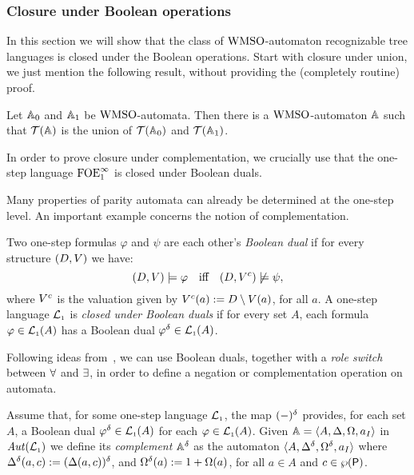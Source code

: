 
\subsubsection{Closure under Boolean operations}

In this section we will show that the class of $\mathrm{WMSO}$-automaton recognizable
tree languages is closed under the Boolean operations.
%
Start with closure under union, we just mention the following result, without
providing the (completely routine) proof.

\begin{theorem}
\label{t:cl-dis}
Let $\mathbb{A}_{0}$ and $\mathbb{A}_{1}$ be $\mathrm{WMSO}$-automata. 
Then there is a $\mathrm{WMSO}$-automaton $\mathbb{A}$ such that $\mathcal{T}(\mathbb{A})$ is the 
union of $\mathcal{T}(\mathbb{A}_{0})$ and $\mathcal{T}(\mathbb{A}_{1})$.
\end{theorem}

In order to prove closure under complementation, we crucially use that the 
one-step language $\mathrm{FOE}^{\infty}_1$ is closed under Boolean duals.

Many properties of parity automata can already be determined at the one-step level.
An important example concerns the notion of complementation.


\begin{definition}
\label{d:bdual1}
Two one-step formulas $\varphi$ and $\psi$ are each other's \emph{Boolean dual}
if for every structure $(D,V)$ we have:
\[
(D,\val) \models \varphi \quad\text{iff}\quad (D,\val^{c}) \not\models \psi,
\]
where $V^{c}$ is the valuation given by $V^{c}(a) \mathrel{:=} D
\setminus V(a)$, for all $a$.
%
A one-step language $\mathcal{L}_{\scriptscriptstyle 1}$ is \emph{closed under Boolean duals} if for every
set $A$, each formula $\varphi \in \mathcal{L}_{\scriptscriptstyle 1}(A)$ has a Boolean dual $\varphi^{\delta}
\in \mathcal{L}_{\scriptscriptstyle 1}(A)$.
\end{definition}

Following ideas from~\cite{Muller1987,DBLP:conf/calco/KissigV09}, we can use Boolean duals, together with a
\emph{role switch} between $\forall$ and $\exists$, in order to define a
negation or complementation operation on automata.

\begin{definition}
\label{d:caut}
Assume that, for some one-step language $\mathcal{L}_{\scriptscriptstyle 1}$, the map $(-)^{\delta}$
provides, for each set $A$, a Boolean dual $\varphi^{\delta} \in \mathcal{L}_{\scriptscriptstyle 1}(A)$ for each
$\varphi \in \mathcal{L}_{\scriptscriptstyle 1}(A)$.
Given $\mathbb{A} = \langle{A,\Delta,\Omega,a_I}\rangle$ in $\mathit{Aut}(\mathcal{L}_{\scriptscriptstyle 1})$ we define its
\emph{complement} $\mathbb{A}^{\delta}$ as the automaton
$\langle{A,\Delta^{\delta},\Omega^{\delta},a_I}\rangle$
where $\Delta^{\delta}(a,c) := (\Delta(a,c))^{\delta}$, and $\Omega^{\delta}(a)
:= 1 + \Omega(a)$, for all $a \in A$ and $c \in \wp(\mathsf{P})$.
\end{definition}

